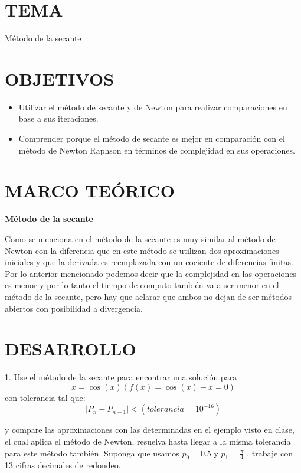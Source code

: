 \documentclass[12pt]{article}
\begin{document}
\section*{TEMA}
Método de la secante

\vspace{0.5cm}

\section*{OBJETIVOS}
\begin{itemize}
    \item Utilizar el método de secante y de Newton para realizar comparaciones en base a sus iteraciones.
    \item Comprender porque el método de secante es mejor en comparación con el método de Newton Raphson en términos de complejidad en sus operaciones.
\end{itemize}

\vspace{0.5cm}

\section*{MARCO TEÓRICO}
\large\textbf{Método de la secante}
\normalsize

Como se menciona en \cite{sauer2013} el método de la secante es muy similar al método de Newton con la diferencia que en este método se utilizan dos aproximaciones iniciales y que la derivada es reemplazada con un cociente de diferencias finitas. 
Por lo anterior mencionado podemos decir que la complejidad en las operaciones es menor y por lo tanto el tiempo de computo también va a ser menor en el método de la secante, pero hay que aclarar que ambos no dejan de ser métodos abiertos con posibilidad a divergencia.

\vspace{0.5cm}

\section*{DESARROLLO}
1. Use el método de la secante para encontrar una solución para
 $$x = \cos(x) (f(x) = \cos(x) - x = 0)$$ 
con tolerancia tal que:
$$
\left| P_n - P_{n-1} \right| < (tolerancia = 10^{-16})
$$

y compare las aproximaciones con las determinadas en el ejemplo visto en clase, el cual aplica el método
de Newton, resuelva hasta llegar a la misma tolerancia para este método también.
Suponga que usamos $p_0 = 0.5$ y $p_1 = \frac{\pi}{4}$ , trabaje con 13 cifras decimales de redondeo.
\end{document}
